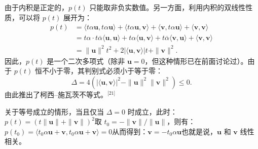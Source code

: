 由于内积是正定的，$p(t)$ 只能取非负实数值。另一方面，利用内积的双线性性质，可以将 $p(t)$ 展开为：
$$
\begin{aligned}
p(t) &= \langle t \alpha \mathbf{u}, t \alpha \mathbf{u} \rangle + \langle t \alpha \mathbf{u}, \mathbf{v} \rangle + \langle \mathbf{v}, t \alpha \mathbf{u} \rangle + \langle \mathbf{v}, \mathbf{v} \rangle \\
&= t \alpha \cdot t \overline{\alpha} \langle \mathbf{u}, \mathbf{u} \rangle + t \alpha \langle \mathbf{u}, \mathbf{v} \rangle + t \overline{\alpha} \langle \mathbf{v}, \mathbf{u} \rangle + \langle \mathbf{v}, \mathbf{v} \rangle \\
&= \|\mathbf{u}\|^2 t^2 + 2 |\langle \mathbf{u}, \mathbf{v} \rangle| t + \|\mathbf{v}\|^2.
\end{aligned}~
$$
因此，$p(t)$ 是一个二次多项式（除非 $\mathbf{u} = 0$，但这种情形已在前面讨论过）。由于 $p(t)$ 恒不小于零，其判别式必须小于等于零：
$$
\Delta = 4 \left( |\langle \mathbf{u}, \mathbf{v} \rangle|^2 - \|\mathbf{u}\|^2 \|\mathbf{v}\|^2 \right) \leq 0.~
$$
由此推出了柯西–施瓦茨不等式。\(^\text{[21]}\)

关于等号成立的情形，当且仅当 $\Delta = 0$ 时成立，此时：$p(t) = \left( t \|\mathbf{u}\| + \|\mathbf{v}\| \right)^2$取 $t_0 = -\|\mathbf{v}\|/\|\mathbf{u}\|$，则有：$p(t_0) = \langle t_0 \alpha \mathbf{u} + \mathbf{v}, t_0 \alpha \mathbf{u} + \mathbf{v} \rangle = 0$从而得到：$\mathbf{v} = -t_0 \alpha \mathbf{u}$也就是说，$\mathbf{u}$ 和 $\mathbf{v}$ 线性相关。
